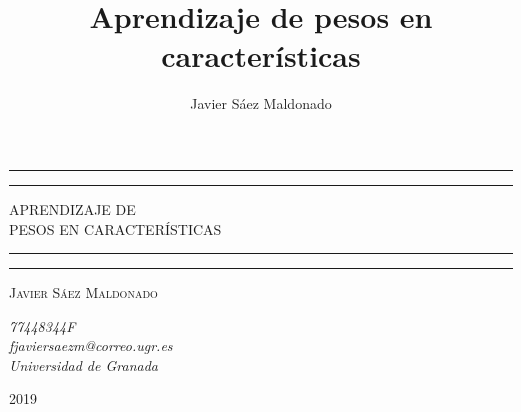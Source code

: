 \documentclass[11pt]{article}
\title{\textbf{Aprendizaje de pesos en características}}
\author{Javier Sáez Maldonado}
\date{}
\begin{document}
\begin{titlepage} %

	\centering %
	
	\scshape %
	
	\vspace*{\baselineskip} %
	
	
	\rule{\textwidth}{1.6pt}\vspace*{-\baselineskip}\vspace*{2pt} %
	\rule{\textwidth}{0.4pt} %
	
	\vspace{0.75\baselineskip} %
	
	{\LARGE APRENDIZAJE DE \\ PESOS EN CARACTERÍSTICAS } %
	
	\vspace{0.75\baselineskip} %
	
	\rule{\textwidth}{0.4pt}\vspace*{-\baselineskip}\vspace{3.2pt} %
	\rule{\textwidth}{1.6pt} %
	
	\vspace{2\baselineskip} %
	
	

	
	\vspace*{3\baselineskip} %
	
	

	
	\vspace{9\baselineskip} %
	
	{\scshape\Large Javier Sáez Maldonado} %
	
	\vspace{0.5\baselineskip} %
	\textit{77448344F}\\
	\textit{fjaviersaezm@correo.ugr.es}\\
	\textit{Universidad de Granada} %
	
	\vfill %
	
	
	
	2019 %
	


\end{titlepage}
\end{document}
